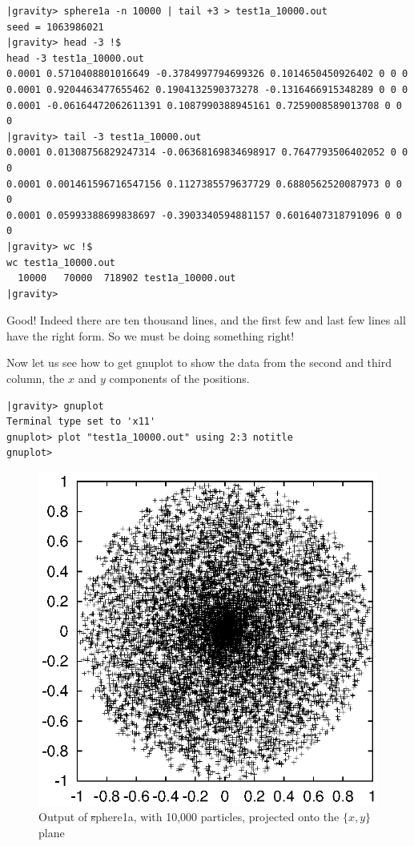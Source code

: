 \begin{small}
\begin{verbatim}
|gravity> sphere1a -n 10000 | tail +3 > test1a_10000.out
seed = 1063986021
|gravity> head -3 !$
head -3 test1a_10000.out
0.0001 0.5710408801016649 -0.3784997794699326 0.1014650450926402 0 0 0
0.0001 0.9204463477655462 0.1904132590373278 -0.1316466915348289 0 0 0
0.0001 -0.06164472062611391 0.1087990388945161 0.7259008589013708 0 0 0
|gravity> tail -3 test1a_10000.out
0.0001 0.01308756829247314 -0.06368169834698917 0.7647793506402052 0 0 0
0.0001 0.001461596716547156 0.1127385579637729 0.6880562520087973 0 0 0
0.0001 0.05993388699838697 -0.3903340594881157 0.6016407318791096 0 0 0
|gravity> wc !$
wc test1a_10000.out
  10000   70000  718902 test1a_10000.out
|gravity>
\end{verbatim}
\end{small}

\abc

\bob
Good!  Indeed there are ten thousand lines, and the first few and last
few lines all have the right form.  So we must be doing something right!

\alice
Now let us see how to get gnuplot to show the data from the second and
third column, the $x$ and $y$ components of the positions.

\cba

\begin{small}
\begin{verbatim}
|gravity> gnuplot
Terminal type set to 'x11'
gnuplot> plot "test1a_10000.out" using 2:3 notitle
gnuplot>
\end{verbatim}
\end{small}

\begin{figure}[htb]
\centering
\includegraphics[width=4.5in]{chap9/test1axy10000.ps}
\caption[xy plot of {\st sphere1a} output]
{Output of {\st sphere1a}, with 10,000 particles, projected onto the
$\{x,y\}$ plane}
\label{fig:sphere1axy10000}
\end{figure}

